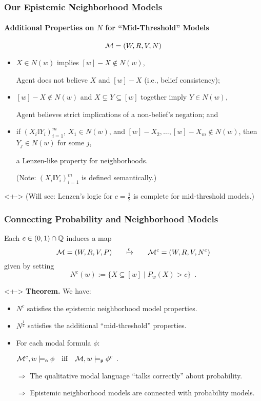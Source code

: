 \begin{frame}
  \frametitle{Our Epistemic Neighborhood Models}
  \framesubtitle{Additional Properties on $N$ for ``Mid-Threshold''
    Models} \vspace{-1em}
  \[
  {\cal M} = (W,R,V,N)
  \]
  \vspace{-1em}
  \begin{itemize}
  \item<+-> $X\in N(w)$ implies $[w]-X\notin N(w)$,

    Agent does not believe $X$ and $[w]-X$ (i.e., belief consistency);

  \item<+-> $[w]-X\notin N(w)$ and
    $X\subsetneq Y\subseteq[w]$ together imply
    $Y\in N(w)$,

    Agent believes strict implications of a non-belief's negation; and

  \item<+-> if $(X_i\mathbb{I}Y_i)_{i=1}^m$, $X_1\in N(w)$, and
    $[w]-X_2,\dots,[w]-X_m\notin N(w)$, then
    $Y_j\in N(w)$ for some $j$,

    a Lenzen-like property for neighborhoods.

    \footnotesize (Note: $(X_i\mathbb{I}Y_i)_{i=1}^m$ is defined
    semantically.)
  \end{itemize}

  \bigskip
  \begin{uncoverenv}<+-> \small (Will see: Lenzen's logic for $c=\frac
    12$ is complete for mid-threshold models.)
  \end{uncoverenv}
\end{frame}

\begin{frame}
  \frametitle{Connecting Probability and Neighborhood Models}
  \uncover<+->{}Each $c\in(0,1)\cap\mathbb{Q}$ induces a map
  \[
  {\cal M}=(W,R,V,P) 
  \qquad{\overset {c\;}\mapsto}\qquad 
  {\cal M}^c=(W,R,V,N^c)
  \]
  \vspace{-1em}
  given by setting
  \[
  N^c(w) := \{ X\subseteq[w] \mid P_w(X) > c \}\enspace.
  \]
  \begin{myboxy}<+->
    \textbf{Theorem.} We have:
    \begin{itemize}
    \item $N^c$ satisfies the epistemic neighborhood model properties.

    \item<+-> $N^{\frac 12}$ satisfies the additional
      ``mid-threshold'' properties.

    \item<+-> For each modal formula $\phi$:
      \begin{center}
        ${\cal M}^c,w\models_{\mathsf{n}}\phi \quad\text{iff}\quad
        {\cal M},w\models_{\mathsf{p}}\phi^c\enspace.$
      \end{center}
      \footnotesize $\Rightarrow$ The qualitative modal language
      ``talks correctly'' about probability.

      $\Rightarrow$ Epistemic neighborhood models are connected with
      probability models.
    \end{itemize}
  \end{myboxy}
\end{frame}

